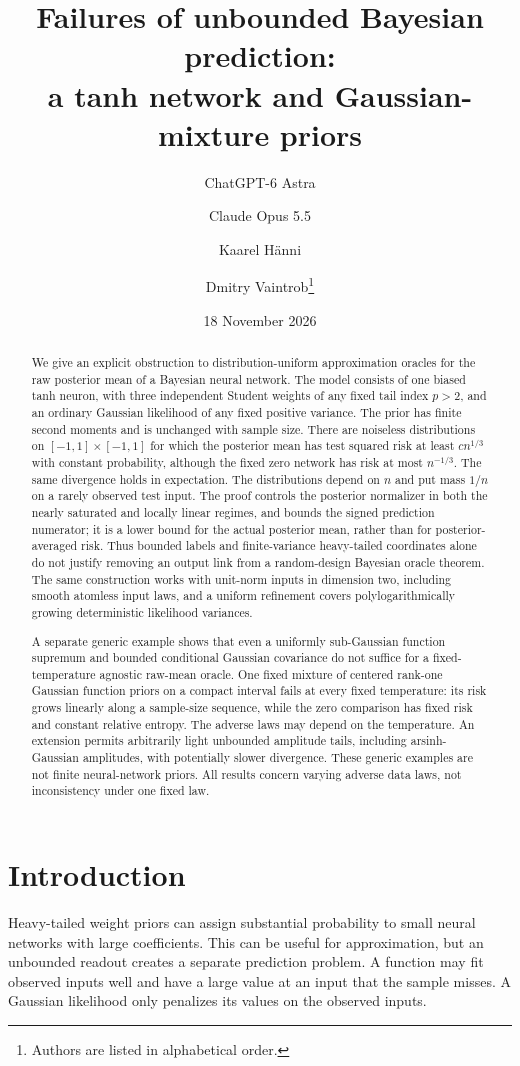 \documentclass[11pt]{article}
\title{Failures of unbounded Bayesian prediction:\\a tanh network and Gaussian-mixture priors}
\author{ChatGPT-6 Astra \and Claude Opus 5.5 \and Kaarel H\"anni \and Dmitry Vaintrob\thanks{Authors are listed in alphabetical order.}}
\date{18 November 2026}
\begin{document}
\maketitle
\begin{abstract}
We give an explicit obstruction to distribution-uniform approximation
oracles for the raw posterior mean of a Bayesian neural network.
The model consists of one biased tanh neuron, with three independent
Student weights of any fixed tail index $p>2$, and an ordinary Gaussian
likelihood of any fixed positive variance. The prior has finite second
moments and is unchanged with sample size. There are noiseless
distributions on $[-1,1]\times[-1,1]$ for which the posterior mean has
test squared risk at least $c n^{1/3}$ with constant probability,
although the fixed zero network has risk at most $n^{-1/3}$.
The same divergence holds in expectation. The distributions depend on
$n$ and put mass $1/n$ on a rarely observed test input. The proof
controls the posterior normalizer in both the nearly saturated and
locally linear regimes, and bounds the signed prediction numerator;
it is a lower bound for the actual posterior mean, rather than for
posterior-averaged risk. Thus bounded labels and finite-variance
heavy-tailed coordinates alone do not justify removing an output link
from a random-design Bayesian oracle theorem.
The same construction works with unit-norm inputs in dimension two,
including smooth atomless input laws, and a uniform refinement covers
polylogarithmically growing deterministic likelihood variances.

A separate generic example shows that even a uniformly sub-Gaussian
function supremum and bounded conditional Gaussian covariance do not
suffice for a fixed-temperature agnostic raw-mean oracle. One fixed
mixture of centered rank-one Gaussian function priors on a compact
interval fails at every fixed temperature: its risk grows linearly
along a sample-size sequence, while the zero comparison has fixed
risk and constant relative entropy. The adverse laws may depend on
the temperature. An extension permits arbitrarily light unbounded
amplitude tails, including arsinh-Gaussian amplitudes, with potentially
slower divergence. These generic examples are not finite neural-network
priors. All results concern varying adverse data laws, not inconsistency
under one fixed law.
\end{abstract}

\section{Introduction}
Heavy-tailed weight priors can assign substantial probability to small
neural networks with large coefficients. This can be useful for
approximation, but an unbounded readout creates a separate prediction
problem. A function may fit observed inputs well and have a large
value at an input that the sample misses. A Gaussian likelihood only
penalizes its values on the observed inputs.
\end{document}
